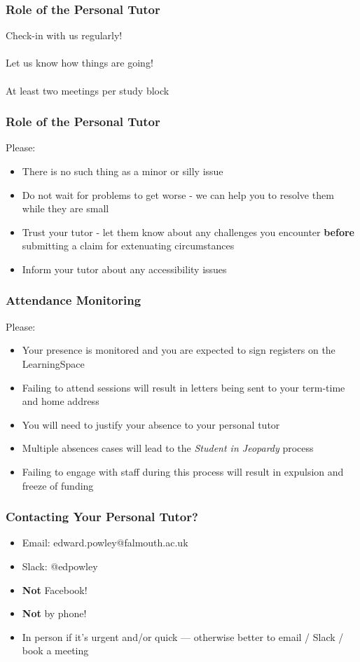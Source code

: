 \begin{frame}
	\frametitle{Role of the Personal Tutor}	
	
	\begin{center}
		Check-in with us regularly!
		\\~\\
		Let us know how things are going!
		\\~\\
		At least two meetings per study block
	\end{center}
\end{frame}

\begin{frame}
	\frametitle{Role of the Personal Tutor}	
	
	Please:
	
	\begin{itemize}
		\item There is no such thing as a minor or silly issue
		\item Do not wait for problems to get worse - we can help you to resolve them while they are small
		\item Trust your tutor - let them know about any challenges you encounter
		         \textbf{before} submitting a claim for extenuating circumstances
		\item Inform your tutor about any accessibility issues
	\end{itemize}
\end{frame}

\begin{frame}
	\frametitle{Attendance Monitoring}	
	
	Please:
	
	\begin{itemize}
		\item Your presence is monitored and you are expected to sign registers on the LearningSpace
		\item Failing to attend sessions will result in letters being sent to your term-time and home address
		\item You will need to justify your absence to your personal tutor
		\item Multiple absences cases will lead to the \textit{Student in Jeopardy} process
		\item Failing to engage with staff during this process will result in expulsion and freeze of funding
	\end{itemize}
\end{frame}

\begin{frame}
	\frametitle{Contacting Your Personal Tutor?}	
	
	\begin{itemize}
		\item Email: edward.powley@falmouth.ac.uk
		\item Slack: @edpowley
		\item \textbf{Not} Facebook!
		\item \textbf{Not} by phone!
		\item In person if it's urgent and/or quick --- otherwise better to email / Slack / book a meeting
	\end{itemize}
\end{frame}

